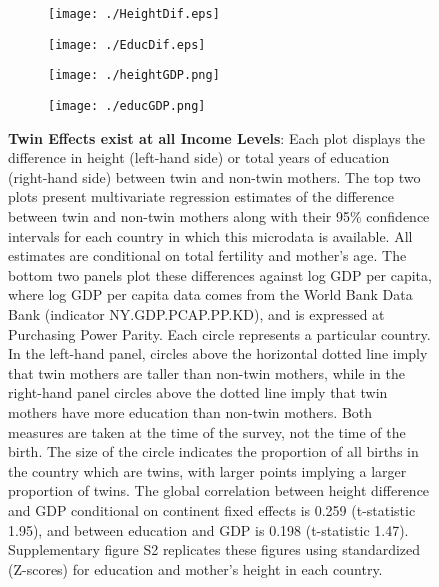 \documentclass{nature}
\begin{document}
\begin{linenumbers}
\begin{spacing}{1}
\begin{figure}[htpb!]
\begin{subfigure}{.5\textwidth}
  \texttt{[image: ./HeightDif.eps]}
\end{subfigure}%
\begin{subfigure}{.5\textwidth}
  \texttt{[image: ./EducDif.eps]}
\end{subfigure}
\begin{subfigure}{.5\textwidth}
  \texttt{[image: ./heightGDP.png]}
\end{subfigure}%
\begin{subfigure}{.5\textwidth}
  \texttt{[image: ./educGDP.png]}
\end{subfigure}
\vspace{5mm}
\caption{\textbf{Twin Effects exist at all Income Levels}: Each plot displays the difference in height (left-hand side) or total years of education (right-hand side) between twin and non-twin mothers.  The top two plots present multivariate regression estimates of the difference between twin and non-twin mothers along with their 95\% confidence intervals for each country in which this microdata is available.  All estimates are conditional on total fertility and mother's age.  The bottom two panels plot these differences against log GDP per capita, where log GDP per capita data comes from the World Bank Data Bank (indicator NY.GDP.PCAP.PP.KD), and is expressed at Purchasing Power Parity.  Each circle represents a particular country.  In the left-hand panel, circles above the horizontal dotted line imply that twin mothers are taller than non-twin mothers, while in the right-hand panel circles above the dotted line imply that twin mothers have more education than non-twin mothers.  Both measures are taken at the time of the survey, not the time of the birth.  The size of the circle indicates the proportion of all births in the country which are twins, with larger points implying a larger proportion of twins. The global correlation between height difference and GDP conditional on continent fixed effects is 0.259 (t-statistic 1.95), and between education and GDP is 0.198 (t-statistic 1.47). Supplementary figure S2 replicates these figures using standardized (Z-scores) for education and mother's height in each country.}
\end{figure}



\end{spacing}
\end{linenumbers}
\end{document}
